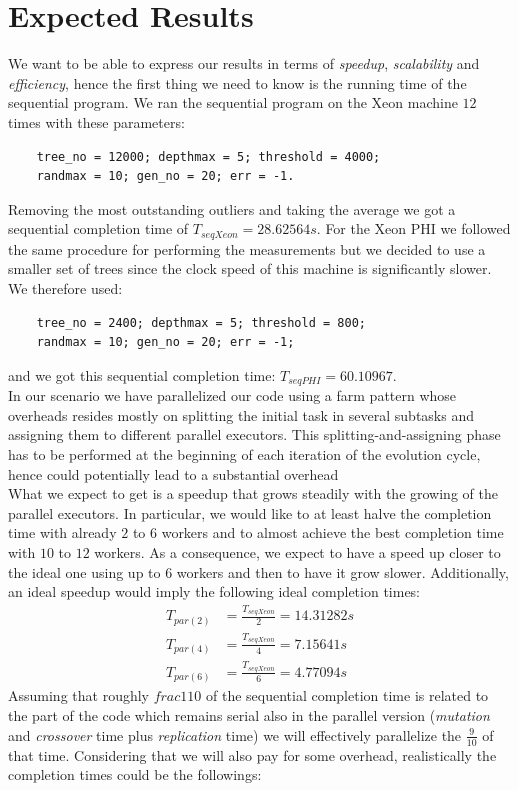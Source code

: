 \documentclass[10pt]{article}
\numberwithin{equation}{section}
\begin{document}
\section{Expected Results}
We want to be able to express our results in terms of \emph{speedup}, \emph{scalability} and \emph{efficiency}, hence the first thing we need to know is the running time of the sequential program. We ran the sequential program on the Xeon machine $12$ times with these parameters:
\begin{verbatim}
	tree_no = 12000; depthmax = 5; threshold = 4000;
	randmax = 10; gen_no = 20; err = -1.
\end{verbatim}
Removing the most outstanding outliers and taking the average we got a sequential completion time of $T_{seqXeon} =  28.62564 s$. For the Xeon PHI we followed the same procedure for performing the measurements but we decided to use a smaller set of trees since the clock speed of this machine is significantly slower. We therefore used:
\begin{verbatim}
	tree_no = 2400; depthmax = 5; threshold = 800;
	randmax = 10; gen_no = 20; err = -1;
\end{verbatim}
and we got this sequential completion time: $T_{seqPHI} = 60.10967$.\\
In our scenario we have parallelized our code using a farm pattern whose overheads resides mostly on splitting the initial task in several subtasks and assigning them to different parallel executors. This splitting-and-assigning phase has to be performed at the beginning of each iteration of the evolution cycle, hence could potentially lead to a substantial overhead\\
What we expect to get is a speedup that grows steadily with the growing of the parallel executors. In particular, we would like to at least halve the completion time with already $2$ to $6$ workers and to almost achieve the best completion time with $10$ to $12$ workers. As a consequence, we expect to have a speed up closer to the ideal one using up to $6$ workers and then to have it grow slower. Additionally, an ideal speedup would imply the following ideal completion times:
\begin{align}
	T_{par\left(2\right)} &= \frac{T_{seqXeon}}{2} = 14.31282s\\
	T_{par\left(4\right)} &= \frac{T_{seqXeon}}{4} = 7.15641s\\
	T_{par\left(6\right)} &= \frac{T_{seqXeon}}{6} = 4.77094s
\end{align}
Assuming that roughly $frac{1}{10}$ of the sequential completion time is related to the part of the code which remains serial also in the parallel version (\emph{mutation} and \emph{crossover} time plus \emph{replication} time) we will effectively parallelize the $\frac{9}{10}$ of that time. Considering that we will also pay for some overhead, realistically the completion times could be the followings:
\end{document}
